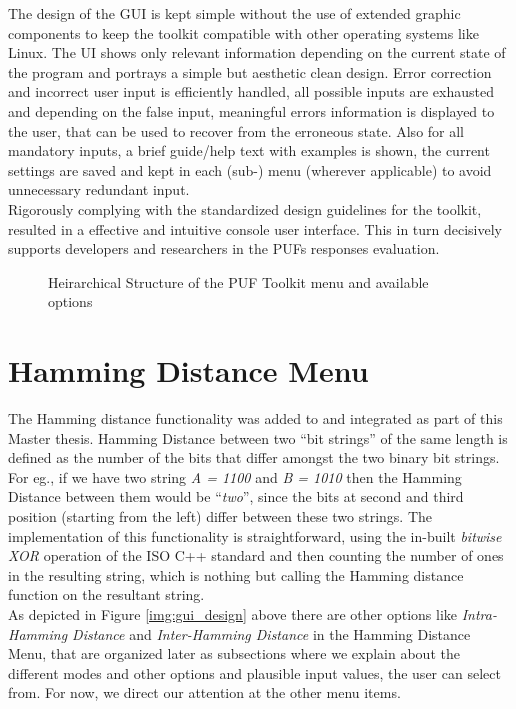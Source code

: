 The design of the GUI is kept simple without the use of extended graphic components to keep the toolkit compatible with other operating systems like Linux. The UI shows only relevant information depending on the current state of the program and portrays a simple but aesthetic clean design. Error correction and incorrect user input is efficiently handled, all possible inputs are exhausted and depending on the false input, meaningful errors information is displayed to the user, that can be used to
recover from the erroneous state. Also for all mandatory inputs, a brief guide/help text with examples is shown, the current settings are saved and kept in each (sub-) menu (wherever applicable) to avoid unnecessary redundant input.\\

Rigorously complying with the standardized design guidelines for the toolkit, resulted in a effective and intuitive console user interface.
This in turn decisively supports developers and researchers in the PUFs responses evaluation.\cite{71}

\begin{figure}
\centering
{}

\caption{Heirarchical Structure of the PUF Toolkit menu and available options}
\label{img:puf_menu}
\end{figure}

\section{Hamming Distance Menu}
\label{Hamming_Distance_menu}
The Hamming distance functionality was added to and integrated as part of this Master thesis. Hamming Distance between two ``bit strings'' of the same length is defined as the number of the bits that differ amongst the two binary bit strings. For eg., if we have two string \emph{A = 1100} and \emph{B = 1010} then the Hamming Distance between them would be ``\emph{two}'', since the bits at second and third position (starting from the left) differ between these two strings. The implementation of
this functionality is straightforward, using the in-built \emph{bitwise XOR} operation of the ISO C++ standard and then counting the number of ones in the resulting string, which is nothing but calling the Hamming distance function on the resultant string.\\

As depicted in Figure \ref{img:gui_design} above there are other options like \emph{Intra-Hamming Distance} and \emph{Inter-Hamming Distance} in the Hamming Distance Menu, that are organized later as subsections where we explain about the different modes and other options and plausible input values, the user can select from. For now, we direct our attention at the other menu items.\\

